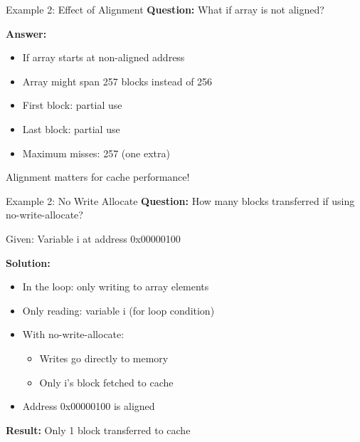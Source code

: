 \documentclass[aspectratio=169,12pt]{beamer}
\begin{document}
\begin{frame}{Example 2: Effect of Alignment}
\textbf{Question:} What if array is not aligned?

\textbf{Answer:}
\begin{itemize}
    \item If array starts at non-aligned address
    \item Array might span 257 blocks instead of 256
    \item First block: partial use
    \item Last block: partial use
    \item Maximum misses: 257 (one extra)
\end{itemize}

\begin{center}
\begin{tcolorbox}[colback=red!10, width=0.8\textwidth]
Alignment matters for cache performance!
\end{tcolorbox}
\end{center}
\end{frame}

\begin{frame}{Example 2: No Write Allocate}
\textbf{Question:} How many blocks transferred if using no-write-allocate?

Given: Variable i at address 0x00000100

\textbf{Solution:}
\begin{itemize}
    \item In the loop: only writing to array elements
    \item Only reading: variable i (for loop condition)
    \item With no-write-allocate:
    \begin{itemize}
        \item Writes go directly to memory
        \item Only i's block fetched to cache
    \end{itemize}
    \item Address 0x00000100 is aligned
\end{itemize}

\textbf{Result:} Only 1 block transferred to cache
\end{frame}
\end{document}
